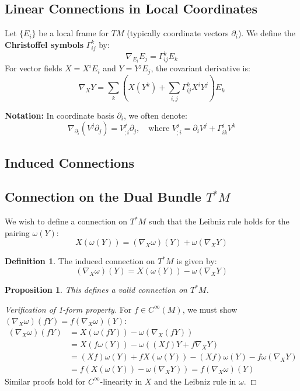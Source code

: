 \documentclass[11pt, a4paper]{article}
\theoremstyle{plain}
\newtheorem{proposition}[theorem]{Proposition}
\theoremstyle{definition}
\newtheorem{definition}[theorem]{Definition}
\theoremstyle{remark}
\begin{document}
\subsection{Linear Connections in Local Coordinates}

Let $\{E_i\}$ be a local frame for $TM$ (typically coordinate vectors $\partial_i$). We define the \textbf{Christoffel symbols} $\Gamma_{ij}^k$ by:
\[ \nabla_{E_i} E_j = \Gamma_{ij}^k E_k \]
For vector fields $X = X^i E_i$ and $Y = Y^j E_j$, the covariant derivative is:
\[ \nabla_X Y = \sum_k \left( X(Y^k) + \sum_{i,j} \Gamma_{ij}^k X^i Y^j \right) E_k \]

\textbf{Notation:} In coordinate basis $\partial_i$, we often denote:
\[ \nabla_{\partial_i} (V^j \partial_j) = V^j_{;i} \partial_j, \quad \text{where } V^j_{;i} = \partial_i V^j + \Gamma_{ik}^j V^k \]

\subsection{Induced Connections}

\subsection*{Connection on the Dual Bundle $T^*M$}
We wish to define a connection on $T^*M$ such that the Leibniz rule holds for the pairing $\omega(Y)$:
\[ X(\omega(Y)) = (\nabla_X \omega)(Y) + \omega(\nabla_X Y) \]
\begin{definition}
The induced connection on $T^*M$ is given by:
\[ (\nabla_X \omega)(Y) = X(\omega(Y)) - \omega(\nabla_X Y) \]
\end{definition}

\begin{proposition}
This defines a valid connection on $T^*M$.
\end{proposition}
\begin{proof}[Verification of 1-form property]
For $f \in C^\infty(M)$, we must show $(\nabla_X \omega)(fY) = f(\nabla_X \omega)(Y)$:
\begin{align*}
    (\nabla_X \omega)(fY) &= X(\omega(fY)) - \omega(\nabla_X (fY)) \\
    &= X(f\omega(Y)) - \omega((Xf)Y + f\nabla_X Y) \\
    &= (Xf)\omega(Y) + f X(\omega(Y)) - (Xf)\omega(Y) - f\omega(\nabla_X Y) \\
    &= f \left( X(\omega(Y)) - \omega(\nabla_X Y) \right) = f (\nabla_X \omega)(Y)
\end{align*}
Similar proofs hold for $C^\infty$-linearity in $X$ and the Leibniz rule in $\omega$.
\end{proof}
\end{document}
